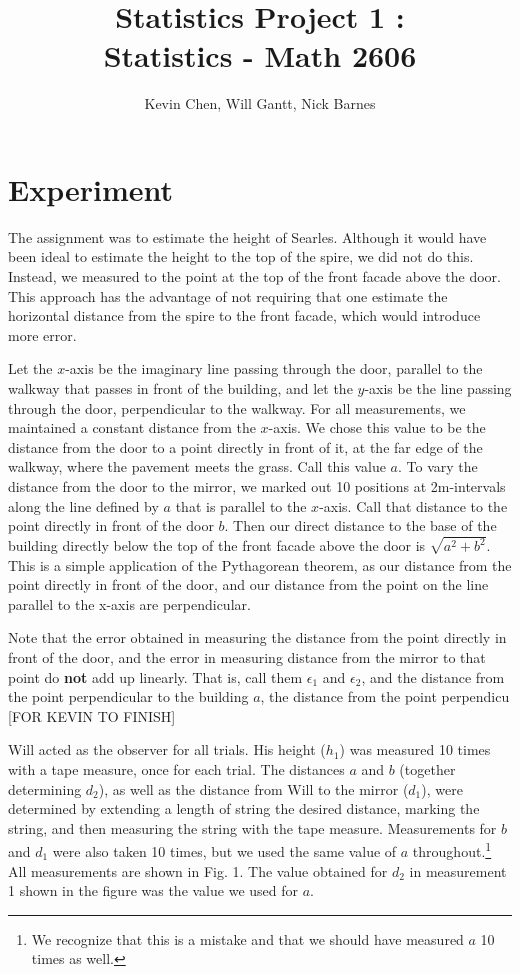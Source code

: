 \documentclass[11pt]{article}
\title{Statistics Project 1 : \\ Statistics - Math 2606}
\author{Kevin Chen, Will Gantt, Nick Barnes}
\date{}
\begin{document}
\maketitle
\section{Experiment}

The assignment was to estimate the height of Searles. Although it would have been ideal to estimate the height to the top of the spire, we did not do this. Instead, we measured to the point at the top of the front facade above the door. This approach has the advantage of not requiring that one estimate the horizontal distance from the spire to the front facade, which would introduce more error.

Let the $x$-axis be the imaginary line passing through the door, parallel to the walkway that passes in front of the building, and let the $y$-axis be the line passing through the door, perpendicular to the walkway. For all measurements, we maintained a constant distance from the $x$-axis. We chose this value to be the distance from the door to a point directly in front of it, at the far edge of the walkway, where the pavement meets the grass. Call this value $a$. To vary the distance from the door to the mirror, we marked out 10 positions at 2m-intervals along the line defined by $a$ that is parallel to the $x$-axis. Call that distance to the point directly in front of the door $b$. Then our direct distance to the base of the building directly below the top of the front facade above the door is $\sqrt{a^2+b^2}$. This is a simple application of the Pythagorean theorem, as our distance from the point directly in front of the door, and our distance from the point on the line parallel to the x-axis are perpendicular. 

Note that the error obtained in measuring the distance from the point directly in front of the door, and the error in measuring distance from the mirror to that point do \textbf{not} add up linearly. That is, call them $\epsilon_1$ and $\epsilon_2$, and the distance from the point perpendicular to the building $a$, the distance from the point perpendicu [FOR KEVIN TO FINISH]

Will acted as the observer for all trials. His height ($h_1$) was measured 10 times with a tape measure, once for each trial. The distances $a$ and $b$ (together determining $d_2$), as well as the distance from Will to the mirror ($d_1$), were determined by extending a length of string the desired distance, marking the string, and then measuring the string with the tape measure. Measurements for $b$ and $d_1$ were also taken 10 times, but we used the same value of $a$ throughout.\footnote{We recognize that this is a mistake and that we should have measured $a$ 10 times as well.} All measurements are shown in Fig. 1. The value obtained for $d_2$ in measurement 1 shown in the figure was the value we used for $a$.
\end{document}
